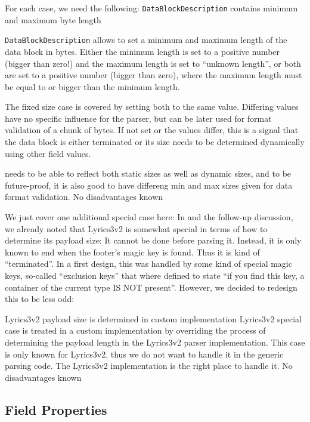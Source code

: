 For each case, we need the following:
{%
\texttt{DataBlockDescription} contains minimum and maximum byte length
}
{%
\texttt{DataBlockDescription} allows to set a minimum and maximum length of the data block in bytes. Either the minimum length is set to a positive number (bigger than zero!) and the maximum length is set to ``unknown length'', or both are set to a positive number (bigger than zero), where the maximum length must be equal to or bigger than the minimum length.

The fixed size case is covered by setting both to the same value. Differing values have no specific influence for the parser, but can be later used for format validation of a chunk of bytes. If not set or the values differ, this is a signal that the data block is either terminated or its size needs to be determined dynamically using other field values.
}
{%
\LibName{} needs to be able to reflect both static sizes as well as dynamic sizes, and to be future-proof, it is also good to have differeng min and max sizes given for data format validation.
}
{%
No disadvantages known
}

We just cover one additional special case here: In  and the follow-up discussion, we already noted that Lyrics3v2 is somewhat special in terms of how to determine its payload size: It cannot be done before parsing it. Instead, it is only known to end when the footer's magic key is found. Thus it is kind of ``terminated''. In a first design, this was handled by some kind of special magic keys, so-called ``exclusion keys'' that where defined to state ``if you find this key, a container of the current type IS NOT present''. However, we decided to redesign this to be less odd:

{%
Lyrics3v2 payload size is determined in custom implementation
}
{%
Lyrics3v2 special case is treated in a custom implementation by overriding the process of determining the payload length in the Lyrics3v2 parser implementation.
}
{%
This case is only known for Lyrics3v2, thus we do not want to handle it in the generic parsing code. The Lyrics3v2 implementation is the right place to handle it.
}
{%
No disadvantages known
}

\subsection{Field Properties}%
\label{sec:FieldProperties}%


